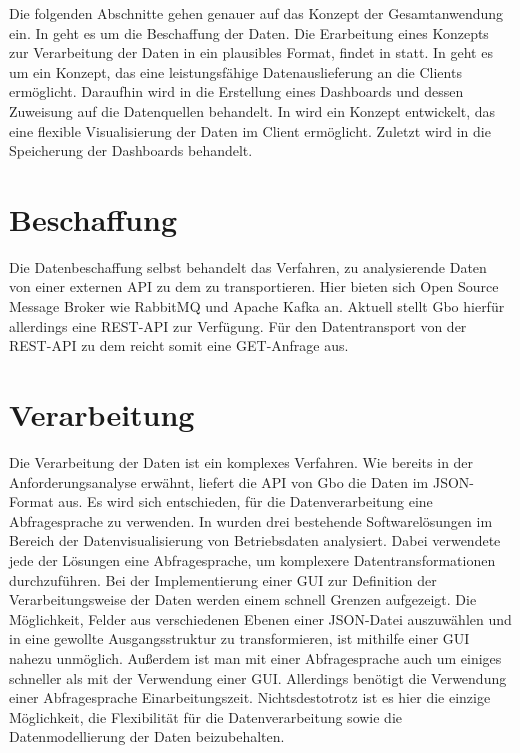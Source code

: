 Die folgenden Abschnitte gehen genauer auf das Konzept der Gesamtanwendung ein.
In  geht es um die Beschaffung der Daten. Die Erarbeitung eines Konzepts zur
Verarbeitung der Daten in ein plausibles Format, findet in  statt.
In  geht es um ein Konzept, das
eine leistungsfähige Datenauslieferung an die Clients ermöglicht.
Daraufhin wird in  die Erstellung eines Dashboards und dessen Zuweisung auf die
Datenquellen behandelt. In  wird ein Konzept entwickelt,
das eine flexible Visualisierung der Daten im Client ermöglicht.
Zuletzt wird in  die Speicherung der Dashboards behandelt.

\section{Beschaffung}
\label{sec:beschaffung}
Die Datenbeschaffung selbst behandelt das Verfahren, zu analysierende Daten
von einer externen API zu dem  zu transportieren.
Hier bieten sich Open Source Message Broker wie RabbitMQ und Apache Kafka an.
Aktuell stellt Gbo hierfür allerdings eine REST-API zur Verfügung.
Für den Datentransport von der REST-API zu dem  reicht somit
eine GET-Anfrage aus.

\section{Verarbeitung}
\label{sec:verarbeitung}
Die Verarbeitung der Daten ist ein komplexes Verfahren. Wie bereits in der
Anforderungsanalyse erwähnt, liefert die API von Gbo die Daten im
JSON-Format aus. Es wird sich entschieden,
für die Datenverarbeitung eine Abfragesprache zu verwenden. In 
wurden drei bestehende Softwarelösungen im Bereich der Datenvisualisierung von
Betriebsdaten analysiert. Dabei verwendete jede der Lösungen eine Abfragesprache,
um komplexere Datentransformationen durchzuführen. Bei der Implementierung einer
GUI zur Definition der Verarbeitungsweise der Daten werden einem schnell Grenzen aufgezeigt.
Die Möglichkeit, Felder aus verschiedenen Ebenen einer JSON-Datei auszuwählen
und in eine gewollte Ausgangsstruktur zu transformieren, ist mithilfe einer GUI nahezu
unmöglich. Außerdem ist man mit einer Abfragesprache auch um einiges schneller als mit
der Verwendung einer GUI. Allerdings benötigt die Verwendung einer Abfragesprache
Einarbeitungszeit. \mbox{Nichtsdestotrotz} ist es hier die einzige Möglichkeit,
die Flexibilität für die Datenverarbeitung sowie die Datenmodellierung der Daten
beizubehalten.

